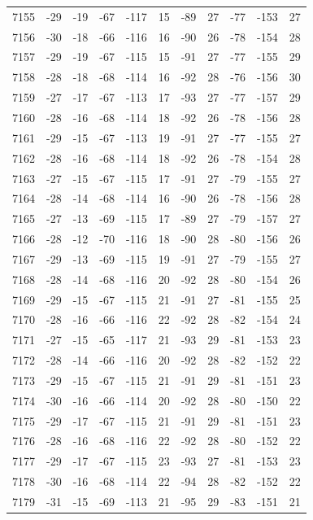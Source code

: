\begin{table}[H]
\begin{tabular}{lllllllllll}
7155 & -29 & -19 & -67 & -117 & 15 & -89 & 27 & -77 & -153 & 27 \\
7156 & -30 & -18 & -66 & -116 & 16 & -90 & 26 & -78 & -154 & 28 \\
7157 & -29 & -19 & -67 & -115 & 15 & -91 & 27 & -77 & -155 & 29 \\
7158 & -28 & -18 & -68 & -114 & 16 & -92 & 28 & -76 & -156 & 30 \\
7159 & -27 & -17 & -67 & -113 & 17 & -93 & 27 & -77 & -157 & 29 \\
7160 & -28 & -16 & -68 & -114 & 18 & -92 & 26 & -78 & -156 & 28 \\
7161 & -29 & -15 & -67 & -113 & 19 & -91 & 27 & -77 & -155 & 27 \\
7162 & -28 & -16 & -68 & -114 & 18 & -92 & 26 & -78 & -154 & 28 \\
7163 & -27 & -15 & -67 & -115 & 17 & -91 & 27 & -79 & -155 & 27 \\
7164 & -28 & -14 & -68 & -114 & 16 & -90 & 26 & -78 & -156 & 28 \\
7165 & -27 & -13 & -69 & -115 & 17 & -89 & 27 & -79 & -157 & 27 \\
7166 & -28 & -12 & -70 & -116 & 18 & -90 & 28 & -80 & -156 & 26 \\
7167 & -29 & -13 & -69 & -115 & 19 & -91 & 27 & -79 & -155 & 27 \\
7168 & -28 & -14 & -68 & -116 & 20 & -92 & 28 & -80 & -154 & 26 \\
7169 & -29 & -15 & -67 & -115 & 21 & -91 & 27 & -81 & -155 & 25 \\
7170 & -28 & -16 & -66 & -116 & 22 & -92 & 28 & -82 & -154 & 24 \\
7171 & -27 & -15 & -65 & -117 & 21 & -93 & 29 & -81 & -153 & 23 \\
7172 & -28 & -14 & -66 & -116 & 20 & -92 & 28 & -82 & -152 & 22 \\
7173 & -29 & -15 & -67 & -115 & 21 & -91 & 29 & -81 & -151 & 23 \\
7174 & -30 & -16 & -66 & -114 & 20 & -92 & 28 & -80 & -150 & 22 \\
7175 & -29 & -17 & -67 & -115 & 21 & -91 & 29 & -81 & -151 & 23 \\
7176 & -28 & -16 & -68 & -116 & 22 & -92 & 28 & -80 & -152 & 22 \\
7177 & -29 & -17 & -67 & -115 & 23 & -93 & 27 & -81 & -153 & 23 \\
7178 & -30 & -16 & -68 & -114 & 22 & -94 & 28 & -82 & -152 & 22 \\
7179 & -31 & -15 & -69 & -113 & 21 & -95 & 29 & -83 & -151 & 21 \\

\end{tabular}
\end{table}
